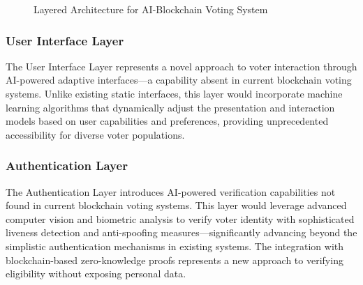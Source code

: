 \documentclass[conference]{IEEEtran}
\begin{document}
\begin{figure}[!htb]
\centering
{}
\caption{Layered Architecture for AI-Blockchain Voting System}
\label{fig:architecture}
\end{figure}

\subsubsection{User Interface Layer}
The User Interface Layer represents a novel approach to voter interaction through AI-powered adaptive interfaces—a capability absent in current blockchain voting systems. Unlike existing static interfaces, this layer would incorporate machine learning algorithms that dynamically adjust the presentation and interaction models based on user capabilities and preferences, providing unprecedented accessibility for diverse voter populations.

\subsubsection{Authentication Layer}
The Authentication Layer introduces AI-powered verification capabilities not found in current blockchain voting systems. This layer would leverage advanced computer vision and biometric analysis to verify voter identity with sophisticated liveness detection and anti-spoofing measures—significantly advancing beyond the simplistic authentication mechanisms in existing systems. The integration with blockchain-based zero-knowledge proofs represents a new approach to verifying eligibility without exposing personal data.
\end{document}
